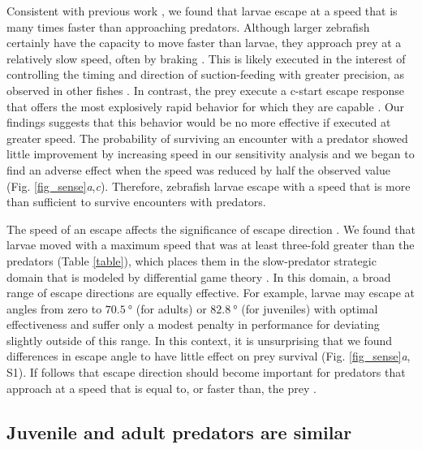 \documentclass[]{rsos}%
\begin{document}
Consistent with previous work \cite{Stewart:2013bha}, we found that larvae escape at a speed that is many times faster than approaching predators.
Although larger zebrafish certainly have the capacity to move faster than larvae, they approach prey at a relatively slow speed, often by braking \cite{McHenry:2005tc}.
This is likely executed in the interest of controlling the timing and direction of suction-feeding with greater precision, as observed in other fishes \cite{Higham:2005iu,Higham:2007go}.
In contrast, the prey execute a c-start escape response that offers the most explosively rapid behavior for which they are capable \cite{Muller:2004hp}.
Our findings suggests that this behavior would be no more effective if executed at greater speed.
The probability of surviving an encounter with a predator showed little improvement by increasing speed in our sensitivity analysis and we began to find an adverse effect when the speed was reduced by half the observed value (Fig. \ref{fig_sense}\textit{a},\textit{c}).
Therefore, zebrafish larvae escape with a speed that is more than sufficient to survive encounters with predators.

The speed of an escape affects the significance of escape direction  \cite{Isaacs:1965uz,Weihs:1984tb}.
We found that larvae moved with a maximum speed that was at least three-fold greater than the predators (Table \ref{table}), which places them in the slow-predator strategic domain that is modeled by differential game theory \cite{Soto:2015cj}.
In this domain, a broad range of escape directions are equally effective.
For example, larvae may escape at angles from zero to $\SI{70.5}{\degree}$ (for adults) or $\SI{82.8}{\degree}$ (for juveniles) with optimal effectiveness \cite{Soto:2015cj} and suffer only a modest penalty in performance for deviating slightly outside of this range. 
In this context, it is unsurprising that we found differences in escape angle to have little effect on prey survival (Fig. \ref{fig_sense}\textit{a}, S1).
If follows that escape direction should become important for predators that approach at a speed that is equal to, or faster than, the prey \cite{Soto:2015cj}. 

\subsection{Juvenile and adult predators are similar} 
\end{document}

